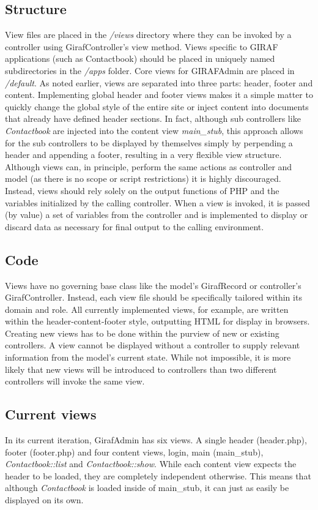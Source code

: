 \subsection{Structure}
View files are placed in the \emph{/views} directory where they can be invoked by a controller using GirafController's view method. Views specific to GIRAF applications (such as Contactbook) should be placed in uniquely named subdirectories in the \emph{/apps} folder. Core views for GIRAFAdmin are placed in \emph{/default}.
As noted earlier, views are separated into three parts: header, footer and content. Implementing global header and footer views makes it a simple matter to quickly change the global style of the entire site or inject content into documents that already have defined header sections. In fact, although sub controllers like \emph{Contactbook} are injected into the content view \emph{main\_stub}, this approach allows for the sub controllers to be displayed by themselves simply by perpending a header and appending a footer, resulting in a very flexible view structure.
Although views can, in principle, perform the same actions as controller and model (as there is no scope or script restrictions) it is highly discouraged. Instead, views should rely solely on the output functions of PHP and the variables initialized by the calling controller. When a view is invoked, it is passed (by value) a set of variables from the controller and is implemented to display or discard data as necessary for final output to the calling environment.

\subsection{Code}
Views have no governing base class like the model's GirafRecord or controller's GirafController. Instead, each view file should be specifically tailored within its domain and role. All currently implemented views, for example, are written within the header-content-footer style, outputting HTML for display in browsers.
Creating new views has to be done within the purview of new or existing controllers. A view cannot be displayed without a controller to supply relevant information from the model's current state. While not impossible, it is more likely that new views will be introduced to controllers than two different controllers will invoke the same view.

\subsection{Current views}
In its current iteration, GirafAdmin has six views. A single header (header.php), footer (footer.php) and four content views, login, main (main\_stub), \emph{Contactbook::list} and \emph{Contactbook::show}. While each content view expects the header to be loaded, they are completely independent otherwise. This means that although \emph{Contactbook} is loaded inside of main\_stub, it can just as easily be displayed on its own.
